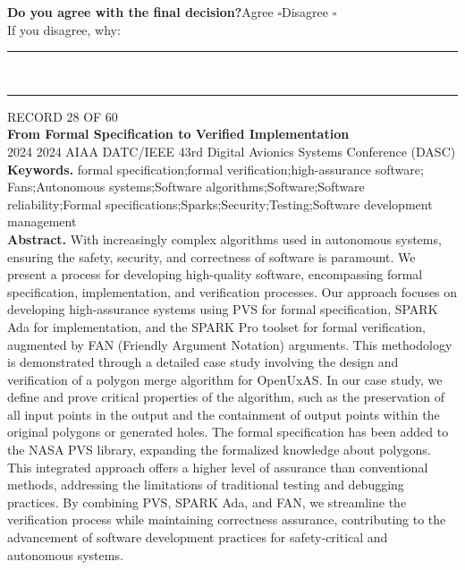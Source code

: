 \documentclass[11pt,a4paper]{article}
\begin{document}
{\small\textbf{Do you agree with the final decision?}\quad{}Agree $\square$\qquad{}Disagree $\square$}\\[1mm]
{\footnotesize\color{soft}If you disagree, why:}\\[1mm]
\color{rule}\rule{\linewidth}{0.3pt}\\[3mm]\rule{\linewidth}{0.3pt}\color{black}
\clearpage
{\color{soft}\footnotesize RECORD 28 OF 60}\\[1mm]
{\large\bfseries From Formal Specification to Verified Implementation}\\[1.5mm]
{\color{soft}\small 2024 \textperiodcentered{} 2024 AIAA DATC/IEEE 43rd Digital Avionics Systems Conference (DASC)}\\[2mm]
{\small\textbf{Keywords.} formal specification;formal verification;high-assurance software; Fans;Autonomous systems;Software algorithms;Software;Software reliability;Formal specifications;Sparks;Security;Testing;Software development management}\\[2mm]
{\small\textbf{Abstract.} With increasingly complex algorithms used in autonomous systems, ensuring the safety, security, and correctness of software is paramount. We present a process for developing high-quality software, encompassing formal specification, implementation, and verification processes. Our approach focuses on developing high-assurance systems using PVS for formal specification, SPARK Ada for implementation, and the SPARK Pro toolset for formal verification, augmented by FAN (Friendly Argument Notation) arguments. This methodology is demonstrated through a detailed case study involving the design and verification of a polygon merge algorithm for OpenUxAS. In our case study, we define and prove critical properties of the algorithm, such as the preservation of all input points in the output and the containment of output points within the original polygons or generated holes. The formal specification has been added to the NASA PVS library, expanding the formalized knowledge about polygons. This integrated approach offers a higher level of assurance than conventional methods, addressing the limitations of traditional testing and debugging practices. By combining PVS, SPARK Ada, and FAN, we streamline the verification process while maintaining correctness assurance, contributing to the advancement of software development practices for safety-critical and autonomous systems.}
\vspace{3mm}
\vspace{2.5mm}
\end{document}
